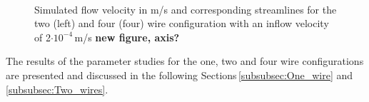 \begin{figure}
\begin{subfigure}{0.49\textwidth}
        \end{subfigure}
        \\
        
        \caption[Simulated flow velocity and corresponding streamlines around two and four wires]{Simulated flow velocity in m/s and corresponding streamlines for the two (left) and four (four) wire configuration with an inflow velocity of 2$\cdotp 10^{-4}$\,m/s \textbf{new figure, axis?}}
        \label{fig:tw_fw_flow_field}
  \end{figure}  
 
The results of the parameter studies for the one, two and four wire configurations are presented and discussed in the following Sections\,\ref{subsubsec:One_wire} and \ref{subsubsec:Two_wires}. 
\FloatBarrier

% 


